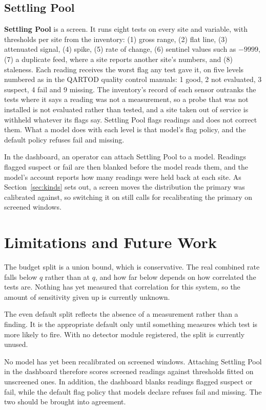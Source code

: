 \documentclass{article}
\begin{document}
\subsection{Settling Pool}

\textbf{Settling Pool} is a screen. It runs eight tests on every site and
variable, with thresholds per site from the inventory: (1) gross range,
(2) flat line, (3) attenuated signal, (4) spike, (5) rate of change,
(6) sentinel values such as $-9999$, (7) a duplicate feed, where a site reports
another site's numbers, and (8) staleness. Each reading receives the worst flag
any test gave it, on five levels numbered as in the QARTOD quality control
manuals: 1 good, 2 not evaluated, 3 suspect, 4 fail and 9 missing. The
inventory's record of each sensor outranks the tests where it says a reading
was not a measurement, so a probe that was not installed is not evaluated
rather than tested, and a site taken out of service is withheld whatever its
flags say. Settling Pool flags readings and does not correct them. What a
model does with each level is that model's flag policy, and the default policy
refuses fail and missing.

In the dashboard, an operator can attach Settling Pool to a model. Readings
flagged suspect or fail are then blanked before the model reads them, and the
model's account reports how many readings were held back at each site. As
Section~\ref{sec:kinds} sets out, a screen moves the distribution the primary
was calibrated against, so switching it on still calls for recalibrating the
primary on screened windows.

\section{Limitations and Future Work}
\label{sec:limitations}

The budget split is a union bound, which is conservative. The real combined
rate falls below $q$ rather than at $q$, and how far below depends on how
correlated the tests are. Nothing has yet measured that correlation for this
system, so the amount of sensitivity given up is currently unknown.

The even default split reflects the absence of a measurement rather than a
finding. It is the appropriate default only until something measures which
test is more likely to fire. With no detector module registered, the split is
currently unused.

No model has yet been recalibrated on screened windows. Attaching Settling Pool
in the dashboard therefore scores screened readings against thresholds fitted
on unscreened ones. In addition, the dashboard blanks readings flagged suspect
or fail, while the default flag policy that models declare refuses fail and
missing. The two should be brought into agreement.
\end{document}
